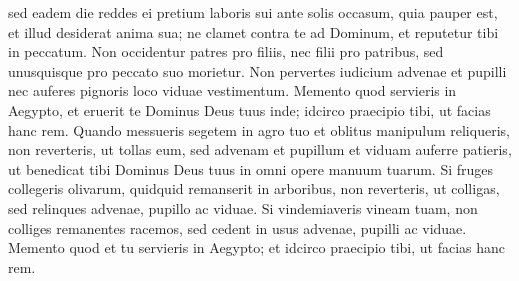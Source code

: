 \begin{biblechapter}
\begin{biblechapter}
\begin{biblechapter}
\begin{biblechapter}
\begin{biblechapter}
\begin{biblechapter}
\begin{biblechapter}
\begin{biblechapter}
\begin{biblechapter}
\begin{biblechapter}
\begin{biblechapter}
\begin{biblechapter}
\begin{biblechapter}
\begin{biblechapter}
\begin{biblechapter}
\begin{biblechapter}
\begin{biblechapter}
\begin{biblechapter}
\begin{biblechapter}
\begin{biblechapter}
\begin{biblechapter}
\begin{biblechapter}
\begin{biblechapter}
\begin{biblechapter}
\verse sed eadem die reddes ei pretium laboris sui ante solis occasum, quia pauper est, et illud desiderat anima sua; ne clamet contra te ad Dominum, et reputetur tibi in peccatum.
 \verse Non occidentur patres pro filiis, nec filii pro patribus, sed unusquisque pro peccato suo morietur.
 \verse Non pervertes iudicium advenae et pupilli nec auferes pignoris loco viduae vestimentum. 
\verse Memento quod servieris in Aegypto, et eruerit te Dominus Deus tuus inde; idcirco praecipio tibi, ut facias hanc rem. 
\verse Quando messueris segetem in agro tuo et oblitus manipulum reliqueris, non reverteris, ut tollas eum, sed advenam et pupillum et viduam auferre patieris, ut benedicat tibi Dominus Deus tuus in omni opere manuum tuarum. 
\verse Si fruges collegeris olivarum, quidquid remanserit in arboribus, non reverteris, ut colligas, sed relinques advenae, pupillo ac viduae. 
\verse Si vindemiaveris vineam tuam, non colliges remanentes racemos, sed cedent in usus advenae, pupilli ac viduae. 
 \verse Memento quod et tu servieris in Aegypto; et idcirco praecipio tibi, ut facias hanc rem.
 

\end{biblechapter}
\end{biblechapter}
\end{biblechapter}
\end{biblechapter}
\end{biblechapter}
\end{biblechapter}
\end{biblechapter}
\end{biblechapter}
\end{biblechapter}
\end{biblechapter}
\end{biblechapter}
\end{biblechapter}
\end{biblechapter}
\end{biblechapter}
\end{biblechapter}
\end{biblechapter}
\end{biblechapter}
\end{biblechapter}
\end{biblechapter}
\end{biblechapter}
\end{biblechapter}
\end{biblechapter}
\end{biblechapter}
\end{biblechapter}

